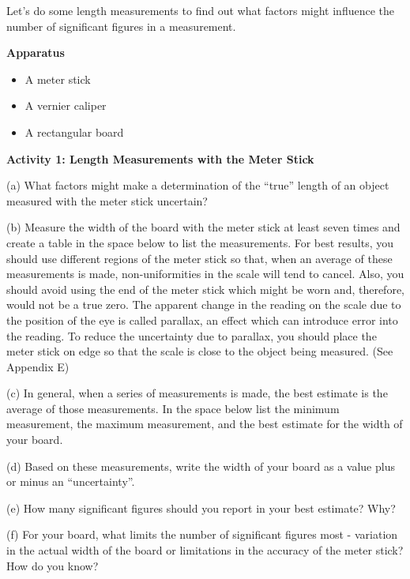 Let's do some length measurements to find out what factors might influence the
number of significant figures in a measurement. 

\textbf{Apparatus} 

\begin{itemize}
\item A meter stick 
\item A vernier caliper 
\item A rectangular board
\end{itemize}
\textbf{Activity 1: Length Measurements with the Meter Stick }

(a) What factors might make a determination of the ``true''
length of an object measured with the meter stick uncertain? 
\vspace{20mm}

(b) Measure the width of the board with the meter stick at least seven times
and create a table in the space below to list the measurements. For best results,
you should use different regions of the meter stick so that, when an average
of these measurements is made, non-uniformities in the scale will tend to cancel.
Also, you should avoid using the end of the meter stick which might be worn
and, therefore, would not be a true zero. The apparent change in the reading
on the scale due to the position of the eye is called parallax, an effect which
can introduce error into the reading. To reduce the uncertainty due to parallax,
you should place the meter stick on edge so that the scale is close to the object
being measured. (See Appendix E) 
\vspace{25mm}

(c) In general, when a series of measurements is made, the best estimate is
the average of those measurements. In the space below list the minimum measurement,
the maximum measurement, and the best estimate for the width of your board.
\vspace{20mm}

(d) Based on these measurements, write the width of your board as a value plus or minus an ``uncertainty''.
\vspace{15mm}

(e) How many significant figures should you report in your best estimate? Why?
\vspace{15mm}

(f) For your board, what limits the number of significant figures most - variation
in the actual width of the board or limitations in the accuracy of the meter
stick? How do you know?
\vspace{15mm}

